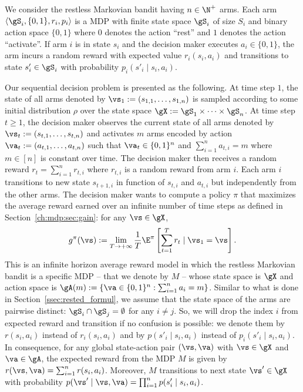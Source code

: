 We consider the restless Markovian bandit having $n\in\N^+$ arms.
Each arm $\langle\gS_i, \{0,1\}, r_i, p_i\rangle$ is a MDP with finite state space $\gS_i$ of size $S_i$ and binary action space $\{0,1\}$ where $0$ denotes the action ``rest'' and $1$ denotes the action ``activate''.
If arm $i$ is in state $s_i$ and the decision maker executes $a_i\in\{0,1\}$, the arm incurs a random reward with expected value $r_i(s_i,a_i)$ and transitions to state $s'_i\in\gS_i$ with probability $p_i(s'_i\mid s_i,a_i)$.

Our sequential decision problem is presented as the following.
At time step $1$, the state of all arms denoted by $\vs_1:=(s_{1,1},\dots,s_{1,n})$ is sampled according to some initial distribution $\rho$ over the state space $\gX:=\gS_1\times\dots\times\gS_n$.
At time step $t\ge1$, the decision maker observes the current state of all arms denoted by $\vs_t:=(s_{t,1},\dots,s_{t,n})$ and activates $m$ arms encoded by action $\va_t:=(a_{t,1},\dots,a_{t,n})$ such that $\va_t\in\{0,1\}^n$ and $\sum_{i=1}^{n} a_{t,i}=m$ where $m\in[n]$ is constant over time.
The decision maker then receives a random reward $r_t=\sum_{i=1}^{n}r_{t,i}$ where $r_{t,i}$ is a random reward from arm $i$.
Each arm $i$ transitions to new state $s_{t+1,i}$ in function of $s_{t,i}$ and $a_{t,i}$ but independently from the other arms.
The decision maker wants to compute a policy $\pi$ that maximizes the average reward earned over an infinite number of time steps as defined in Section~\ref{ch:mdp:sec:gain}: for any $\vs\in\gX$,
\begin{equation}
    \label{ch:mb:eq:gain_defn}
    g^\pi(\vs) := \lim_{T\to+\infty}\frac1T \E^\pi\left[ \sum_{t=1}^{T} r_t \mid \vs_1=\vs\right].
\end{equation}
This is an infinite horizon average reward model in which the restless Markovian bandit is a specific MDP -- that we denote by $M$ -- whose state space is $\gX$ and action space is $\gA(m):=\{\va\in\{0,1\}^n : \sum_{i=1}^{n}a_i =m\}$.
Similar to what is done in Section~\ref{ssec:rested_formul}, we assume that the state space of the arms are pairwise distinct: $\gS_i\cap\gS_j=\emptyset$ for any $i\neq j$.
So, we will drop the index $i$ from expected reward and transition if no confusion is possible: we denote them by $r(s_i,a_i)$ instead of $r_i(s_i,a_i)$ and by $p(s'_i\mid s_i,a_i)$ instead of $p_i(s'_i\mid s_i,a_i)$.
In consequence, for any global state-action pair $(\vs,\va)$ with $\vs\in\gX$ and $\va\in\gA$, the expected reward from the MDP $M$ is given by $r(\vs,\va)=\sum_{i=1}^{n}r(s_i,a_i)$.
Moreover, $M$ transitions to next state $\vs'\in\gX$ with probability $p(\vs'\mid \vs,\va)=\prod_{i=1}^n p(s'_i\mid s_i,a_i)$.

